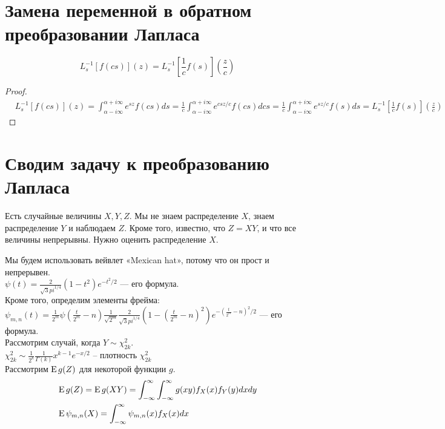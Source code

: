 \documentclass[a4paper, fleqn]{report}
\begin{document}
\section{Замена переменной в обратном преобразовании Лапласа}
\begin{Th*}
\[
    L^{-1}_s \left[ f(cs) \right](z) = L^{-1}_s \left[ \frac{1}{c}f(s) \right]\left(\frac{z}{c}\right)
\]
\end{Th*}
\begin{proof}
\begin{align*}
& L^{-1}_s\left[f(cs)\right](z) 
= \int_{\alpha-i\infty}^{\alpha+i\infty} e^{sz}f(cs)ds 
= \frac{1}{c} \int_{\alpha-i\infty}^{\alpha+i\infty} e^{csz/c} f(cs) dcs
= \frac{1}{c} \int_{\alpha-i\infty}^{\alpha+i\infty} e^{sz/c} f(s) ds
= L^{-1}_s \left[ \frac{1}{c} f(s) \right]\left( \frac{z}{c} \right)  
\end{align*}
\end{proof}

\section {Сводим задачу к преобразованию Лапласа}
Есть случайные величины $X, Y, Z$. Мы не знаем распределение $X$, знаем распределение $Y$ и наблюдаем $Z$. Кроме того, известно, что $Z = XY$, и что все величины непрерывны. Нужно оценить распределение $X$.

Мы будем использовать вейвлет «Mexican hat», потому что он прост и непрерывен. \\
$\psi(t) = \frac{2}{\sqrt{3} pi^{1 / 4}} (1-t^2)e^{-t^2 / 2}$ --- его формула. \\

Кроме того, определим элементы фрейма: \\
$\psi_{m,n}(t) = \frac{1}{2^m} \psi\left( \frac{t}{2^m}-n \right)  \frac{1}{\sqrt{2^m} }\frac{2}{\sqrt{3} pi^{1 / 4}} (1-\left( \frac{t}{2^m} - n \right)^2)e^{-\left( \frac{t}{2^m} - n \right)^2 / 2}$ --- его формула. \\

Рассмотрим случай, когда $Y \sim \chi^2_{2k}$. \\
$\chi^2_{2k} \sim \frac{1}{2^k} \frac{1}{\Gamma(k)} x^{k-1} e^{-x / 2}$ -- плотность $\chi^2_{2k}$ \\


Рассмотрим $\operatorname{E} g(Z)$ для некоторой функции $g$.
\begin{align*}
    & \operatorname{E} g(Z) = \operatorname{E} g(XY) = \int_{-\infty}^{\infty} \int_{-\infty}^{\infty} g(xy) f_X(x) f_Y(y) dx dy \\
    & \operatorname{E} \psi_{m,n}(X) = \int_{-\infty}^{\infty} \psi_{m,n}(x) f_X(x) dx 
\end{align*}
\end{document}

